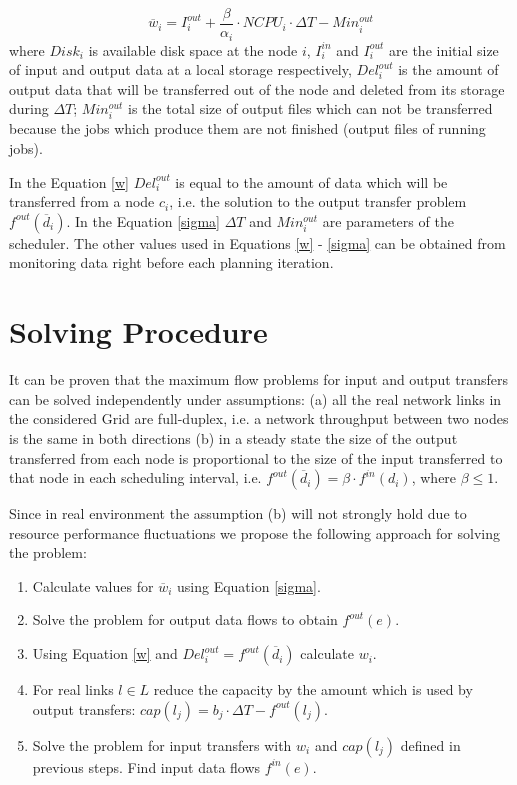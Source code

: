\begin{equation}
\label{sigma}
\overline{w}_{i} = I_{i}^{out} + \frac{\beta}{\alpha_{i}} \cdot NCPU_{i} \cdot \Delta T - Min_{i}^{out}
\end{equation}  
where $Disk_{i}$ is available disk space at the node $i$, 
$I_{i}^{in}$ and $I_{i}^{out}$ are the initial size of input and output data at a local storage respectively,
$Del_{i}^{out}$ is the amount of output data that will be transferred out of the node and deleted from its storage during $\Delta T$; 
$Min_{i}^{out}$ is the total size of output files which can not be transferred because the jobs which produce them are not finished (output files of running jobs). 

In the Equation \ref{w} $Del_{i}^{out}$ is equal to the amount of data which will be transferred from a node $c_{i}$, i.e. the solution to the output transfer problem $f^{out}(\overline{d}_{i})$. In the Equation \ref{sigma} $\Delta T$ and  $Min_{i}^{out}$ are parameters of the scheduler. The other values used in Equations \ref{w} - \ref{sigma} can be obtained from monitoring data right before each planning iteration.

\section{Solving Procedure}
\label{solve}
It can be proven that the maximum flow problems for input and output transfers can be solved independently under assumptions: (a) all the real network links in the considered Grid are full-duplex, i.e. a network throughput between two nodes is the same in both directions (b) in a steady state the size of the output transferred from each node is proportional to the size of the input transferred to that node in each scheduling interval, i.e. $f^{out}(\overline{d}_{i})= \beta \cdot f^{in}(d_{i})$, where $\beta \leq 1$.

Since in real environment the assumption (b) will not strongly hold due to resource performance fluctuations we propose the following approach for solving the problem:

\begin{enumerate}
\item Calculate values for $\overline{w}_{i}$ using Equation \ref{sigma}.
\item Solve the problem for output data flows to obtain $f^{out}(e)$.
\item Using Equation \ref{w} and $Del_{i}^{out} = f^{out}(\overline{d}_{i})$ calculate $w_{i}$.
\item For real links $l \in L$ reduce the capacity by the amount which is used by output transfers: $cap(l_{j}) = b_{j} \cdot \Delta T - f^{out}(l_{j})$.
\item Solve the problem for input transfers with $w_{i}$ and $cap(l_{j})$ defined in previous steps. Find input data flows $f^{in}(e)$.
\end{enumerate}

